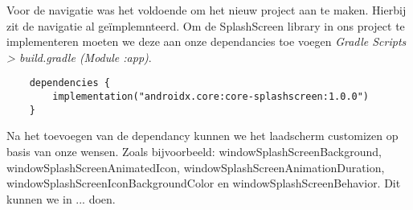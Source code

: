 Voor de navigatie was het voldoende om het nieuw project aan te maken. Hierbij zit de navigatie al geïmplemnteerd.
Om de SplashScreen library in ons project te implementeren moeten we deze aan onze dependancies toe voegen 
\textit{Gradle Scripts > build.gradle (Module :app)}.
\begin{verbatim}
    dependencies {
        implementation("androidx.core:core-splashscreen:1.0.0")
    }
\end{verbatim}
Na het toevoegen van de dependancy kunnen we het laadscherm customizen op basis van onze wensen. Zoals bijvoorbeeld: 
windowSplashScreenBackground, windowSplashScreenAnimatedIcon, windowSplashScreenAnimationDuration, 
windowSplashScreenIconBackgroundColor en windowSplashScreenBehavior. Dit kunnen we in ... doen.